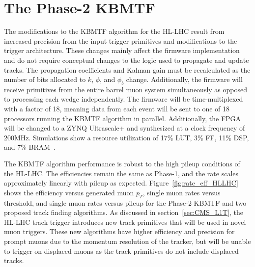 \section{The Phase-2 KBMTF} \label{sec:HL_KBMTF}
The modifications to the KBMTF algorithm for the HL-LHC result from increased precision from the input trigger primitives and modifications to the trigger architecture. These changes mainly affect the firmware implementation and do not require conceptual changes to the logic used to propagate and update tracks. The propagation coefficients and Kalman gain must be recalculated as the number of bits allocated to $k$, $\phi$, and $\phi_b$ change. Additionally, the firmware will receive primitives from the entire barrel muon system simultaneously as opposed to processing each wedge independently. The firmware will be time-multiplexed with a factor of 18, meaning data from each event will be sent to one of 18 processors running the KBMTF algorithm in parallel. Additionally, the FPGA will be changed to a ZYNQ Ultrascale+ and synthesized at a clock frequency of 200\unit{MHz}. Simulations show a resource utilization of 17\% LUT, 3\% FF, 11\% DSP, and 7\% BRAM~\cite{CERN-LHCC-2020-004}.

The KBMTF algorithm performance is robust to the high pileup conditions of the HL-LHC. The efficiencies remain the same as Phase-1, and the rate scales approximately linearly with pileup as expected. Figure~\ref{fig:rate_eff_HLLHC} shows the efficiency versus generated muon $p_T$, single muon rates versus threshold, and single muon rates versus pileup for the Phase-2 KBMTF and two proposed track finding algorithms. As discussed in section~\ref{sec:CMS_L1T}, the HL-LHC track trigger introduces new track primitives that will be used in novel muon triggers. These new algorithms have higher efficiency and precision for prompt muons due to the momentum resolution of the tracker, but will be unable to trigger on displaced muons as the track primitives do not include displaced tracks. 

